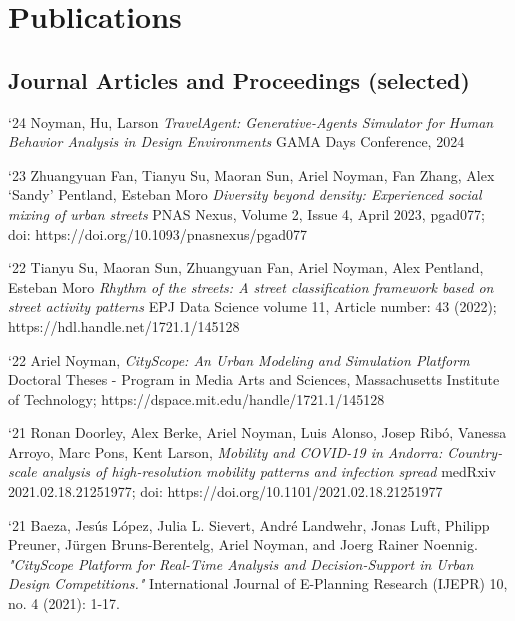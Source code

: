 \section*{Publications}

\subsection*{Journal Articles and Proceedings (selected)}

\begin{tablist}

    \item[`24] \tab
    Noyman, Hu, Larson
    \textit{TravelAgent: Generative-Agents Simulator for Human Behavior Analysis in Design Environments}
    GAMA Days Conference, 2024

    \item[`23] \tab
    Zhuangyuan Fan, Tianyu Su, Maoran Sun, Ariel Noyman, Fan Zhang, Alex ‘Sandy’ Pentland, Esteban Moro
    \textit{Diversity beyond density: Experienced social mixing of urban streets}
    PNAS Nexus, Volume 2, Issue 4, April 2023, pgad077; doi: https://doi.org/10.1093/pnasnexus/pgad077

    \item[`22] \tab
    Tianyu Su, Maoran Sun, Zhuangyuan Fan, Ariel Noyman, Alex Pentland, Esteban Moro
    \textit{Rhythm of the streets: A street classification framework based on street activity patterns}
    EPJ Data Science volume 11, Article number: 43 (2022); https://hdl.handle.net/1721.1/145128


    \item[`22] \tab
    Ariel Noyman,
    \textit{CityScope: An Urban Modeling and Simulation Platform}
    Doctoral Theses - Program in Media Arts and Sciences,
    Massachusetts Institute of Technology; https://dspace.mit.edu/handle/1721.1/145128

    \item[`21] \tab
    Ronan Doorley, Alex Berke, Ariel Noyman, Luis Alonso, Josep Ribó, Vanessa Arroyo, Marc Pons, Kent Larson,
    \textit{Mobility and COVID-19 in Andorra: Country-scale analysis of high-resolution mobility patterns and infection spread}
    medRxiv 2021.02.18.21251977; doi: https://doi.org/10.1101/2021.02.18.21251977


    \item[`21] \tab
    Baeza, Jesús López, Julia L. Sievert, André Landwehr, Jonas Luft, Philipp Preuner, Jürgen Bruns-Berentelg, Ariel Noyman, and Joerg Rainer Noennig. \textit{"CityScope Platform for Real-Time Analysis and Decision-Support in Urban Design Competitions."} International Journal of E-Planning Research (IJEPR) 10, no. 4 (2021): 1-17.



\end{tablist}
